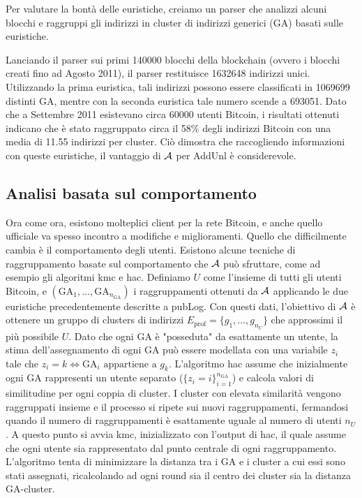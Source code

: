 Per valutare la bontà delle euristiche, creiamo un parser che analizzi alcuni blocchi e raggruppi gli indirizzi in cluster di indirizzi generici (GA) basati sulle euristiche.

Lanciando il parser sui primi 140000 blocchi della blockchain (ovvero i blocchi creati fino ad Agosto 2011), il parser restituisce 1632648 indirizzi unici.
Utilizzando la prima euristica, tali indirizzi possono essere classificati in 1069699 distinti GA, mentre con la seconda euristica tale numero scende a 693051.
Dato che a Settembre 2011 esistevano circa 60000 utenti Bitcoin, i risultati ottenuti indicano che è stato raggruppato circa il 58\% degli indirizzi Bitcoin con una media di 11.55 indirizzi per cluster.
Ciò dimostra che raccogliendo informazioni con queste euristiche, il vantaggio di $\mathcal{A}$ per AddUnl è considerevole.

\subsection{Analisi basata sul comportamento}

Ora come ora, esistono molteplici client per la rete Bitcoin, e anche quello ufficiale va spesso incontro a modifiche e miglioramenti.
Quello che difficilmente cambia è il comportamento degli utenti.
Esistono alcune tecniche di raggruppamento basate sul comportamento che $\mathcal{A}$ può sfruttare, come ad esempio gli algoritmi \gls{kmc} e \gls{hac}.
Definiamo $U$ come l'insieme di tutti gli utenti Bitcoin, e $\left( \text{GA}_1 , \ldots , \text{GA}_{n_\text{GA}} \right)$ i raggruppamenti ottenuti da $\mathcal{A}$ applicando le due euristiche precedentemente descritte a pubLog.
Con questi dati, l'obiettivo di $\mathcal{A}$  è ottenere un gruppo di clusters di indirizzi $E_\text{prof} = \{ g_1 , \ldots , g_{n_U} \}$ che approssimi il più possibile $U$.
Dato che ogni GA è "posseduta" da esattamente un utente, la stima dell'assegnamento di ogni GA può essere modellata con una variabile $z_i$ tale che $z_i = k \iff \text{GA}_i \text{ appartiene a } g_k$.
L'algoritmo \gls{hac} assume che inizialmente ogni GA rappresenti un utente separato ($\{ z_i = i \}^{n_\text{GA}}_{i=1}$) e calcola valori di similitudine per ogni coppia di cluster. I cluster con elevata similarità vengono raggruppati insieme e il processo si ripete sui nuovi raggruppamenti, fermandosi quando il numero di raggruppamenti è esattamente uguale al numero di utenti $n_U$.
A questo punto si avvia \gls{kmc}, inizializzato con l'output di \gls{hac}, il quale assume che ogni utente sia rappresentato dal punto centrale di ogni raggruppamento. L'algoritmo tenta di minimizzare la distanza tra i GA e i cluster a cui essi sono stati assegnati, ricalcolando ad ogni round sia il centro dei cluster sia la distanza GA-cluster.

